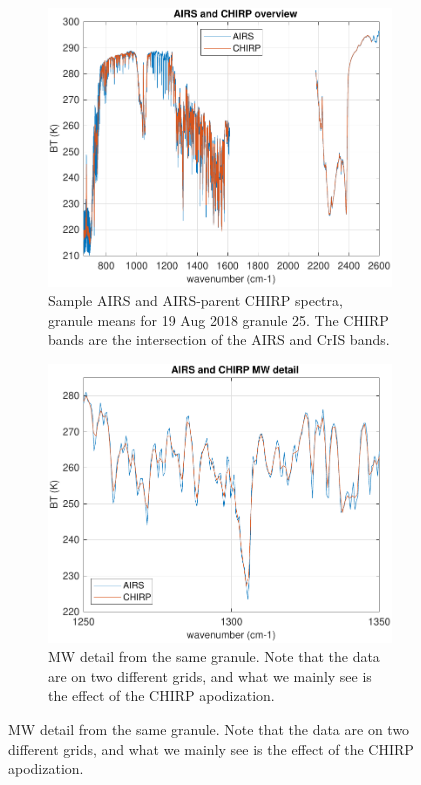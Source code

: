 \documentclass[12pt]{article}
\begin{document}
\begin{figure}
  \begin{subfigure}[b]{0.45\textwidth}
    \includegraphics[width=\textwidth]{figures/airs_and_chirp_overview.pdf}
    \caption{Sample AIRS and AIRS-parent CHIRP spectra, granule means
      for 19 Aug 2018 granule 25.  The CHIRP bands are the intersection
      of the AIRS and CrIS bands.}
    \label{figA}
  \end{subfigure}
  \hskip5mm
  \begin{subfigure}[b]{0.45\textwidth}
    \includegraphics[width=\textwidth]{figures/airs_and_chirp_mw_detail.pdf}
    \caption{MW detail from the same granule.  Note that the data
      are on two different grids, and what we mainly see is the
      effect of the CHIRP apodization.}
    \label{figB}
  \end{subfigure}
\end{figure}
\end{document}
